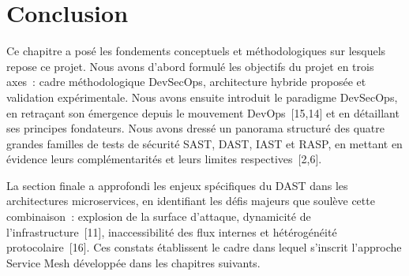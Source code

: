 \section*{Conclusion}
\label{sec:conclusion-ch1}

Ce chapitre a posé les fondements conceptuels et méthodologiques sur lesquels
repose ce projet. Nous avons d'abord formulé les objectifs du projet en trois
axes~: cadre méthodologique DevSecOps, architecture hybride proposée et
validation expérimentale. Nous avons ensuite introduit le paradigme DevSecOps,
en retraçant son émergence depuis le mouvement DevOps~[15,14] et en détaillant ses
principes fondateurs. Nous avons dressé un panorama structuré des quatre grandes
familles de tests de sécurité SAST, DAST, IAST et RASP, en mettant en évidence
leurs complémentarités et leurs limites respectives~[2,6].

La section finale a approfondi les enjeux spécifiques du DAST dans les
architectures microservices, en identifiant les défis majeurs que soulève cette
combinaison~: explosion de la surface d'attaque, dynamicité de
l'infrastructure~[11], inaccessibilité des flux internes et hétérogénéité
protocolaire~[16]. Ces constats établissent le cadre dans lequel s'inscrit
l'approche Service Mesh développée dans les chapitres suivants.
